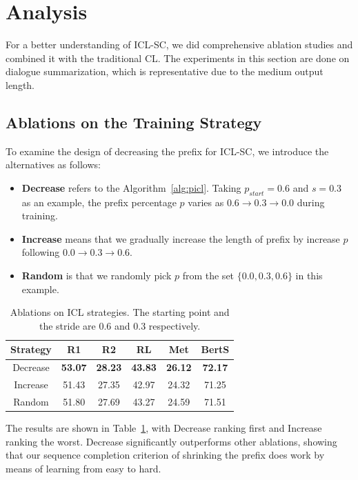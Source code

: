 \section{Analysis}


For a better understanding of ICL-SC, 
we did comprehensive ablation studies and combined it with the traditional CL. The experiments in this section are done on dialogue summarization, which is representative due to the medium output length.




\subsection{Ablations on the Training Strategy}

To examine the design of decreasing the prefix for ICL-SC, we introduce the alternatives as follows:
\begin{itemize}
	\item \textbf{Decrease} refers to the Algorithm~\ref{alg:picl}. Taking $p_{start}=0.6$ and $s=0.3$ as an example, the prefix percentage $p$ varies as $0.6\rightarrow 0.3\rightarrow 0.0$ during training.
	\item \textbf{Increase} means that we gradually increase the length of prefix by increase $p$ following $0.0\rightarrow0.3\rightarrow0.6$.
	\item \textbf{Random} is that we randomly pick $p$ from the set $\{0.0, 0.3, 0.6\}$ in this example.
\end{itemize}


\begin{table}[h]
	\scriptsize
	\centering
	\begin{tabular}{cccccc}
		\hline
		{Strategy} & {R1} & {R2} & {RL} & {Met} & {BertS} \\
		\hline
		Decrease &\textbf{53.07} & \textbf{28.23} & \textbf{43.83} & \textbf{26.12} & \textbf{72.17}\\
		Increase & 51.43 & 27.35 & 42.97 & 24.32 & 71.25 \\
		Random & 51.80 & 27.69 & 43.27 & 24.59 & 71.51 \\
		\hline
	\end{tabular}
	\caption{Ablations on ICL strategies. The starting point and the stride are 0.6 and 0.3 respectively.}
	\label{tab:ablstrategy}
\end{table}

The results are shown in Table~\ref{tab:ablstrategy}, with Decrease ranking first and Increase ranking the worst.
Decrease significantly outperforms other ablations, showing that our sequence completion criterion of shrinking the prefix does work by means of learning from easy to hard.




